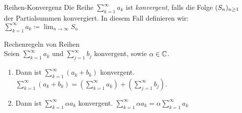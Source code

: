 
\begin{definition}{Reihen-Konvergenz}
    Die Reihe $\sum_{k = 1}^\infty a_k$ ist \emph{konvergent}, falls die Folge $\sequence[S]$ der Partialsummen konvergiert. In diesem Fall definieren wir: $\sum_{k = 1}^\infty a_k \coloneqq \lim_{n \to \infty} S_n$
\end{definition}
\begin{theorem}{Rechenregeln von Reihen}
    \\Seien $\sum_{k=1}^\infty a_k$ und $\sum_{j=1}^\infty b_j$ konvergent, sowie $\alpha \in \C$.
    \begin{enumerate}
        \item Dann ist $\sum_{k=1}^\infty (a_k + b_k)$ konvergent.\\
            $\sum_{k=1}^\infty (a_k + b_k) = (\sum_{k=1}^\infty a_k) + (\sum_{j=1}^\infty b_j)$.
        \item Dann ist $\sum_{k=1}^\infty \alpha a_k$ konvergent. $\sum_{k=1}^\infty \alpha a_k = \alpha \sum_{k=1}^\infty a_k$
    \end{enumerate}
\end{theorem}









